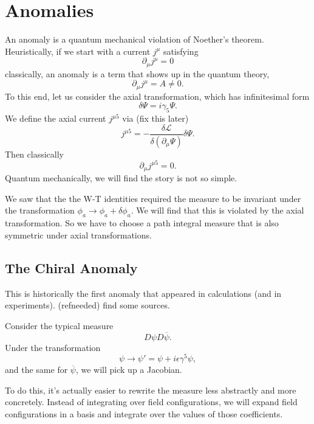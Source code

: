 \documentclass[main.tex]{subfiles}
\begin{document}
\chapter{Anomalies}
An anomaly is a quantum mechanical violation of Noether's theorem. Heuristically, if we start with a current  $j^\mu$ satisfying
\[
\partial_\mu j^\mu = 0
\]
classically, an anomaly is a term that shows up in the quantum theory,
\[
\partial_\mu j^\mu = A \neq 0.
\]
To this end, let us consider the axial transformation, which has infinitesimal form
\[
\delta \Psi = i \gamma_5 \Psi.
\]
We define the axial current $j^{\mu 5}$ via (fix this later)
\begin{equation} \label{axialcurrent}
j^{\mu 5}= - \frac{\delta \mathcal{L}}{\delta (\partial_\mu \Psi)} \delta \Psi.
\end{equation}
Then classically 
\[
\partial_\mu j^{\mu 5} = 0.
\]
Quantum mechanically, we will find the story is not so simple. 

We saw that the the W-T identities required the measure to be invariant under the transformation $\phi_a \to \phi_a + \delta \phi_a$. We will find that this is violated by the axial transformation. So we have to choose a path integral measure that is also symmetric under axial transformations.

\section{The Chiral Anomaly}
This is historically the first anomaly that appeared in calculations (and in experiments). (refneeded) find some sources.

Consider the typical measure
\begin{equation} \label{pimeas}
D\psi D \overline{\psi}.
\end{equation}
Under the transformation
\begin{equation} \label{axialtrans}
\psi \to \psi' = \psi + i \epsilon \gamma^5 \psi,
\end{equation}
and the same for $\overline{\psi}$, we will pick up a Jacobian.

To do this, it's actually easier to rewrite the measure less abstractly and more concretely. Instead of integrating over field configurations, we will expand field configurations in a basis and integrate over the values of those coefficients. 
\end{document}
